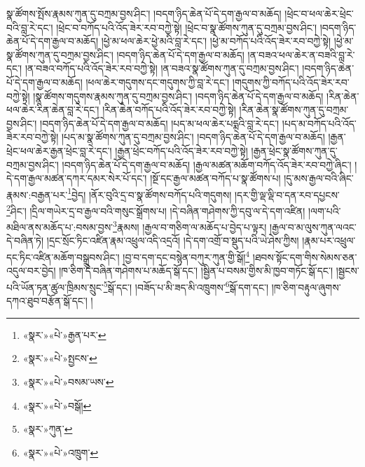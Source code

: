སྣ་ཚོགས་སྤོས་རྣམས་ཀུན་དུ་བཀྲམ་བྱས་ཤིང་། །བདག་ཉིད་ཆེན་པོ་དེ་དག་རྒྱལ་བ་མཆོད། །ཕྲེང་བ་ཕལ་ཆེར་ཕྲེང་བའི་བླ་རེ་དང་། །ཕྲེང་བ་བཀོད་པའི་འོད་ཟེར་རབ་བཀྱེ་སྟེ། །ཕྲེང་བ་སྣ་ཚོགས་ཀུན་དུ་བཀྲམ་བྱས་ཤིང་། །བདག་ཉིད་ཆེན་པོ་དེ་དག་རྒྱལ་བ་མཆོད། །ཕྱེ་མ་ཕལ་ཆེར་ཕྱེ་མའི་བླ་རེ་དང་། །ཕྱེ་མ་བཀོད་པའི་འོད་ཟེར་རབ་བཀྱེ་སྟེ། །ཕྱེ་མ་སྣ་ཚོགས་ཀུན་དུ་བཀྲམ་བྱས་ཤིང་། །བདག་ཉིད་ཆེན་པོ་དེ་དག་རྒྱལ་བ་མཆོད། །ན་བཟའ་ཕལ་ཆེར་ན་བཟའི་བླ་རེ་དང་། །ན་བཟའ་བཀོད་པའི་འོད་ཟེར་རབ་བཀྱེ་སྟེ། །ན་བཟའ་སྣ་ཚོགས་ཀུན་དུ་བཀྲམ་བྱས་ཤིང་། །བདག་ཉིད་ཆེན་པོ་དེ་དག་རྒྱལ་བ་མཆོད། །ཕལ་ཆེར་གདུགས་དང་གདུགས་ཀྱི་བླ་རེ་དང་། །གདུགས་ཀྱི་བཀོད་པའི་འོད་ཟེར་རབ་བཀྱེ་སྟེ། །སྣ་ཚོགས་གདུགས་རྣམས་ཀུན་དུ་བཀྲམ་བྱས་ཤིང་། །བདག་ཉིད་ཆེན་པོ་དེ་དག་རྒྱལ་བ་མཆོད། །རིན་ཆེན་ཕལ་ཆེར་རིན་ཆེན་བླ་རེ་དང་། །རིན་ཆེན་བཀོད་པའི་འོད་ཟེར་རབ་བཀྱེ་སྟེ། །རིན་ཆེན་སྣ་ཚོགས་ཀུན་དུ་བཀྲམ་བྱས་ཤིང་། །བདག་ཉིད་ཆེན་པོ་དེ་དག་རྒྱལ་བ་མཆོད། །པད་མ་ཕལ་ཆེར་པདྨའི་བླ་རེ་དང་། །པད་མ་བཀོད་པའི་འོད་ཟེར་རབ་བཀྱེ་སྟེ། །པད་མ་སྣ་ཚོགས་ཀུན་དུ་བཀྲམ་བྱས་ཤིང་། །བདག་ཉིད་ཆེན་པོ་དེ་དག་རྒྱལ་བ་མཆོད། །རྒྱན་ཕྲེང་ཕལ་ཆེར་རྒྱན་ཕྲེང་བླ་རེ་དང་། །རྒྱན་ཕྲེང་བཀོད་པའི་འོད་ཟེར་རབ་བཀྱེ་སྟེ། །རྒྱན་ཕྲེང་སྣ་ཚོགས་ཀུན་དུ་བཀྲམ་བྱས་ཤིང་། །བདག་ཉིད་ཆེན་པོ་དེ་དག་རྒྱལ་བ་མཆོད། །རྒྱལ་མཚན་མཆོག་བཀོད་འོད་ཟེར་རབ་བཀྱེ་ཞིང་། །དེ་དག་རྒྱལ་མཚན་དཀར་དམར་སེར་པོ་དང་། །སྔོ་དང་རྒྱལ་མཚན་བཀོད་པ་སྣ་ཚོགས་པ། །དུ་མས་རྒྱལ་བའི་ཞིང་རྣམས་:བརྒྱན་པར་\footnote{«སྣར་»«པེ་»རྒྱན་པར་}བྱེད། །ནོར་བུའི་དྲ་བ་སྣ་ཚོགས་བཀོད་པའི་གདུགས། །དར་གྱི་ལྡ་ལྡི་བ་དན་རབ་དཔྱངས་\footnote{«སྣར་»«པེ་»སྤྱངས་}ཤིང་། །དྲིལ་གཡེར་དྲ་བ་རྒྱལ་བའི་གསུང་སྒྲོགས་པ། །དེ་བཞིན་གཤེགས་ཀྱི་དབུ་ལ་དེ་དག་འཛིན། །ལག་པའི་མཐིལ་ནས་མཆོད་པ་:བསམ་བྱས་\footnote{«སྣར་»«པེ་»བསམ་ཡས་}རྣམས། །རྒྱལ་བ་གཅིག་ལ་མཆོད་པ་བྱེད་པ་ལྟར། །རྒྱལ་བ་མ་ལུས་ཀུན་ལའང་དེ་བཞིན་ཏེ། །དྲང་སྲོང་ཏིང་འཛིན་རྣམ་འཕྲུལ་འདི་འདྲའོ། །དེ་དག་འགྲོ་བ་སྡུད་པའི་ཡེ་ཤེས་ཀྱིས། །རྣམ་པར་འཕྲུལ་དང་ཏིང་འཛིན་མཆོག་བསྒྲུབས་ཤིང་། །བྱ་བ་དག་དང་བསྙེན་བཀུར་ཀུན་གྱི་སྒོ།\footnote{«སྣར་»«པེ་»བསྒོ།} །ཐབས་སྟོང་དག་གིས་སེམས་ཅན་འདུལ་བར་བྱེད། །ཁ་ཅིག་དེ་བཞིན་གཤེགས་པ་མཆོད་སྒོ་དང་། །སྦྱིན་པ་བསམ་གྱིས་མི་ཁྱབ་གཏོང་སྒོ་དང་། །སྦྱངས་པའི་ཡོན་ཏན་ཚུལ་ཁྲིམས་སྲུང་\footnote{«སྣར་»ཀུན་}སྒོ་དང་། །བཟོད་པ་མི་ཟད་མི་འཁྲུགས་\footnote{«སྣར་»«པེ་»འཁྲུག་}སྒོ་དག་དང་། །ཁ་ཅིག་བརྟུལ་ཞུགས་དཀའ་ཐུབ་བརྩོན་སྒོ་དང་། །
